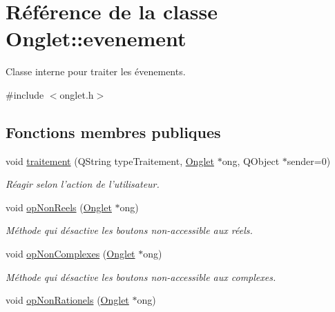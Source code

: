 \hypertarget{class_onglet_1_1evenement}{\section{Référence de la classe Onglet\-:\-:evenement}
\label{class_onglet_1_1evenement}
}


Classe interne pour traiter les évenements.  




{\ttfamily \#include $<$onglet.\-h$>$}

\subsection*{Fonctions membres publiques}
\begin{DoxyCompactItemize}
\item 
void \hyperlink{class_onglet_1_1evenement_af0fd82d8213ce1e7d0ca021eb8903888}{traitement} (Q\-String type\-Traitement, \hyperlink{class_onglet}{Onglet} $\ast$ong, Q\-Object $\ast$sender=0)
\begin{DoxyCompactList}\small\item\em Réagir selon l'action de l'utilisateur. \end{DoxyCompactList}\item 
\hypertarget{class_onglet_1_1evenement_a1c8815617f15cfe57a7c267edbd085ec}{void \hyperlink{class_onglet_1_1evenement_a1c8815617f15cfe57a7c267edbd085ec}{op\-Non\-Reels} (\hyperlink{class_onglet}{Onglet} $\ast$ong)}\label{class_onglet_1_1evenement_a1c8815617f15cfe57a7c267edbd085ec}

\begin{DoxyCompactList}\small\item\em Méthode qui désactive les boutons non-\/accessible aux réels. \end{DoxyCompactList}\item 
\hypertarget{class_onglet_1_1evenement_ad5ed69991e6e1a2b92c542f3e850e7a2}{void \hyperlink{class_onglet_1_1evenement_ad5ed69991e6e1a2b92c542f3e850e7a2}{op\-Non\-Complexes} (\hyperlink{class_onglet}{Onglet} $\ast$ong)}\label{class_onglet_1_1evenement_ad5ed69991e6e1a2b92c542f3e850e7a2}

\begin{DoxyCompactList}\small\item\em Méthode qui désactive les boutons non-\/accessible aux complexes. \end{DoxyCompactList}\item 
\hypertarget{class_onglet_1_1evenement_a6980506e8a68ec43501d7facf9cdc421}{void \hyperlink{class_onglet_1_1evenement_a6980506e8a68ec43501d7facf9cdc421}{op\-Non\-Rationels} (\hyperlink{class_onglet}{Onglet} $\ast$ong)}\label{class_onglet_1_1evenement_a6980506e8a68ec43501d7facf9cdc421}


\end{DoxyCompactItemize}
